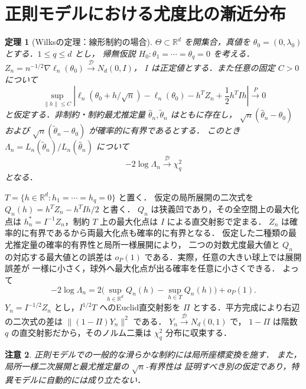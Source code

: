 \documentclass[a5paper,10pt,onecolumn]{jsarticle}
\makeatletter
\theoremstyle{mathnotetheorem}
\newtheorem{theorem}{定理}[section]
\newtheorem{remark}[theorem]{注意}
\renewcommand{\proofname}{証明}
\renewenvironment{proof}[1][\proofname]{%
  \par\pushQED{\qed}\normalfont\topsep4\p@\@plus2\p@\relax
  \trivlist\item[\hskip\labelsep\bfseries #1]\ignorespaces
}{\popQED\endtrivlist\@endpefalse}
\newcommand{\norm}[1]{\lVert #1\rVert}
\makeatother
\begin{document}
\section{正則モデルにおける尤度比の漸近分布}
\begin{theorem}[Wilksの定理：線形制約の場合]
$\Theta\subset\mathbb R^d$ を開集合，真値を
$\theta_0=(0,\lambda_0)$ とする．$1\le q\le d$ とし，
帰無仮説 $H_0:\theta_1=\cdots=\theta_q=0$ を考える．
$Z_n=n^{-1/2}\nabla\ell_n(\theta_0)\xrightarrow{\mathcal D}N_d(0,I)$，
$I$ は正定値とする．また任意の固定 $C>0$ について
\[
 \sup_{\norm h\le C}\left|\ell_n(\theta_0+h/\sqrt n)-
 \ell_n(\theta_0)-h^TZ_n+\frac12h^TIh\right|\xrightarrow{P}0
\]
と仮定する．非制約・制約最尤推定量 $\widehat\theta_n,
\widetilde\theta_n$ はともに存在し，
$\sqrt n(\widehat\theta_n-\theta_0)$ および
$\sqrt n(\widetilde\theta_n-\theta_0)$ が確率的に有界であるとする．
このとき $\Lambda_n=L_n(\widetilde\theta_n)/L_n(\widehat\theta_n)$
について
\[
 -2\log\Lambda_n\xrightarrow{\mathcal D}\chi_q^2
\]
となる．
\end{theorem}
\begin{proof}
$T=\{h\in\mathbb R^d:h_1=\cdots=h_q=0\}$ と置く．
仮定の局所展開の二次式を $Q_n(h)=h^TZ_n-h^TIh/2$ と書く．
$Q_n$ は狭義凹であり，その全空間上の最大化点は
$h_n^*=I^{-1}Z_n$，制約 $T$ 上の最大化点は
$I$ による直交射影で定まる．
$Z_n$ は確率的に有界であるから両最大化点も確率的に有界となる．
仮定した二種類の最尤推定量の確率的有界性と局所一様展開により，
二つの対数尤度最大値と $Q_n$ の対応する最大値との誤差は
$o_P(1)$ である．実際，任意の大きい球上では展開誤差が
一様に小さく，球外へ最大化点が出る確率を任意に小さくできる．
よって
\[
 -2\log\Lambda_n
 =2\bigl(\sup_{h\in\mathbb R^d}Q_n(h)-
 \sup_{h\in T}Q_n(h)\bigr)+o_P(1).
\]
$Y_n=I^{-1/2}Z_n$ とし，$I^{1/2}T$ へのEuclid直交射影を
$\Pi$ とする．平方完成により右辺の二次式の差は
$\norm{(1-\Pi)Y_n}^2$ である．
$Y_n\xrightarrow{\mathcal D}N_d(0,1)$ で，
$1-\Pi$ は階数 $q$ の直交射影だから，そのノルム二乗は
$\chi_q^2$ 分布に収束する．
\end{proof}
\begin{remark}
正則モデルでの一般的な滑らかな制約には局所座標変換を施す．
また，局所一様二次展開と最尤推定量の $\sqrt n$-有界性は
証明すべき別の仮定であり，特異モデルに自動的には成り立たない．
\end{remark}
\end{document}
